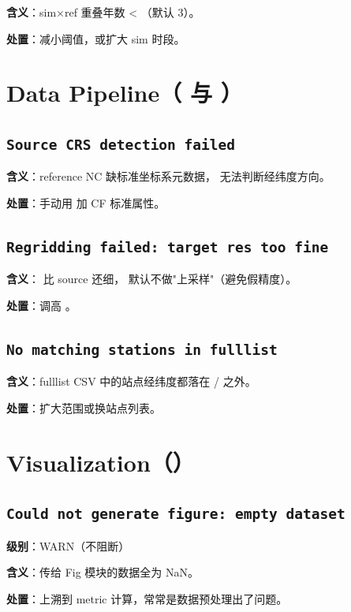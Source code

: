 \textbf{含义}：sim×ref 重叠年数 < （默认 3）。

\textbf{处置}：减小阈值，或扩大 sim 时段。

\section{Data Pipeline（ 与 ）}

\subsection{\texttt{Source CRS detection failed}}

\textbf{含义}：reference NC 缺标准坐标系元数据，\openbench{} 无法判断经纬度方向。

\textbf{处置}：手动用  加 CF 标准属性。

\subsection{\texttt{Regridding failed: target res too fine}}

\textbf{含义}： 比 source 还细，\openbench{} 默认不做"上采样"（避免假精度）。

\textbf{处置}：调高 。

\subsection{\texttt{No matching stations in fulllist}}

\textbf{含义}：fulllist CSV 中的站点经纬度都落在 / 之外。

\textbf{处置}：扩大范围或换站点列表。

\section{Visualization（）}

\subsection{\texttt{Could not generate figure: empty dataset}}

\textbf{级别}：WARN（不阻断）

\textbf{含义}：传给 Fig 模块的数据全为 NaN。

\textbf{处置}：上溯到 metric 计算，常常是数据预处理出了问题。

